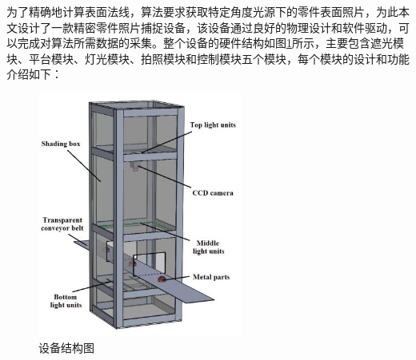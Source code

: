 为了精确地计算表面法线，算法要求获取特定角度光源下的零件表面照片，为此本文设计了一款精密零件照片捕捉设备，该设备通过良好的物理设计和软件驱动，可以完成对算法所需数据的采集。整个设备的硬件结构如图\ref{zheguangmokuai}所示，主要包含遮光模块、平台模块、灯光模块、拍照模块和控制模块五个模块，每个模块的设计和功能介绍如下：
\begin{figure}[htbp]
\centering
\includegraphics[width=0.6\textwidth]{figures/zheguangmokuai.png}
\caption{设备结构图}\label{zheguangmokuai}
\end{figure}
